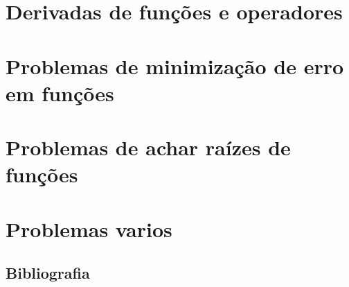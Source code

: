 \documentclass[12pt,fleqn]{book} %
\begin{document}
\part{Derivadas de funções e operadores}
%






\part{Problemas de minimização de erro em funções}






\part{Problemas de achar raízes de funções}


\part{Problemas varios}



\chapter*{Bibliografia}
\end{document}
